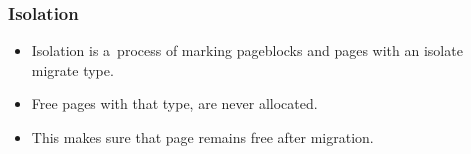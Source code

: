 \begin{frame}
  \frametitle{Isolation}

  \begin{itemize}
  \item Isolation is a~process of marking pageblocks and pages with an
    isolate migrate type.
  \item Free pages with that type, are never allocated.
  \item This makes sure that page remains free after migration.
  \end{itemize}
\end{frame}

